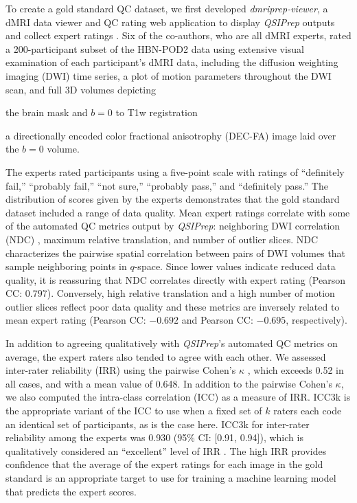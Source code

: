 \documentclass[9pt,lineno]{elife}
\begin{document}
To create a gold standard QC dataset, we first developed \emph{dmriprep-viewer},
a dMRI data viewer and QC rating web application to display \emph{QSIPrep}
outputs and collect expert ratings \citep{richie-halford2021-viewer}. Six of the
co-authors, who are all dMRI experts, rated a 200-participant subset of the
HBN-POD2 data using extensive visual examination of each participant's dMRI data,
including the diffusion weighting imaging (DWI) time series, a plot of
motion parameters throughout the DWI scan, and full 3D volumes depicting
\begin{enumerate*}[%
    label=(\roman*),%
    before={{ }},%
    itemjoin={{, }},%
    itemjoin*={{ and }}]
    \item the brain mask and $b=0$ to T1w registration
    \item a directionally encoded color fractional anisotrophy (DEC-FA) image laid over the $b=0$ volume.
\end{enumerate*}
The experts rated participants using a five-point scale with ratings of ``definitely
fail,'' ``probably fail,'' ``not sure,'' ``probably pass,'' and ``definitely
pass.'' The distribution of scores given by the experts demonstrates that the
gold standard dataset included a range of data quality. Mean expert ratings
correlate with some of the automated QC metrics output by \emph{QSIPrep}:
neighboring DWI correlation (NDC) \citep{yeh2019-kb}, maximum relative
translation, and number of outlier slices. NDC characterizes
the pairwise spatial correlation between pairs of DWI volumes that sample
neighboring points in $q$-space. Since lower values indicate reduced data
quality, it is reassuring that NDC correlates directly with expert rating
(Pearson CC: $0.797$). Conversely, high relative translation and a high number of
motion outlier slices reflect poor data quality and these metrics are inversely
related to mean expert rating (Pearson CC: $-0.692$ and Pearson CC: $-0.695$,
respectively).

In addition to agreeing qualitatively with \emph{QSIPrep}'s automated QC metrics
on average, the expert raters also tended to agree with each other. We assessed
inter-rater reliability (IRR) using the pairwise Cohen's $\kappa$
\citep{di-eugenio2004-bb}, which exceeds 0.52 in all cases, and with a mean value of
0.648. In addition to the pairwise Cohen's $\kappa$, we also computed the
intra-class correlation (ICC) \citep{hallgren2012-ze} as a measure of IRR. ICC3k
is the appropriate variant of the ICC to use when a fixed set of $k$ raters each
code an identical set of participants, as is the case here. ICC3k for inter-rater
reliability among the experts was 0.930 (95\% CI: [0.91, 0.94]), which is
qualitatively considered an ``excellent'' level of IRR \citep{Cicchetti1994-fz}.
The high IRR provides confidence that the average of the expert ratings for each
image in the gold standard is an appropriate target to use for training a
machine learning model that predicts the expert scores.
\end{document}
